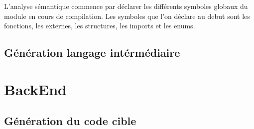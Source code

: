 \documentclass[a4paper, 11pt]{article}
\begin{document}
L'analyse sémantique commence par déclarer les différents symboles globaux du module en cours de compilation. Les symboles que l'on déclare au debut sont les fonctions, les externes, les structures, les imports et les enums.


\subsection {Génération langage intérmédiaire}

\section {BackEnd}
\subsection {Génération du code cible}
\end{document}
